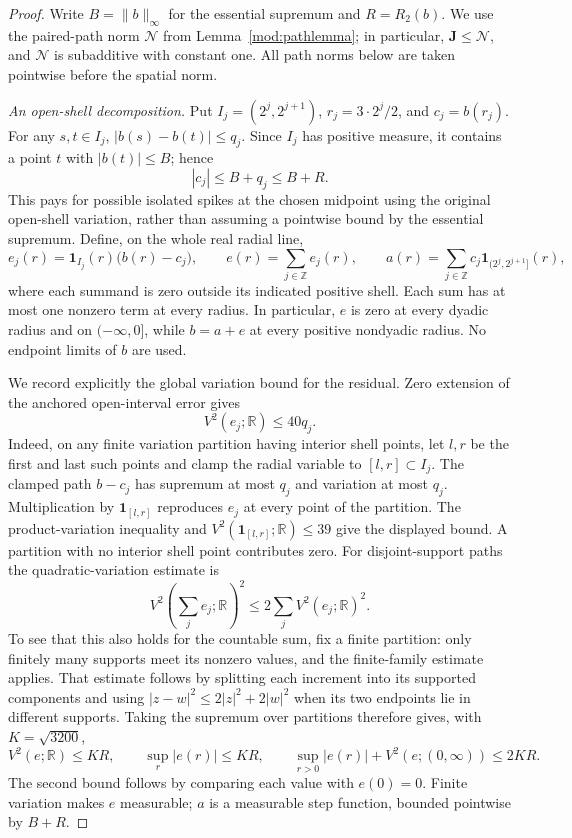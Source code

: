 \documentclass[11pt]{article}
\numberwithin{equation}{section}
\theoremstyle{remark}
\theoremstyle{definition}
\newcommand{\R}{\mathbb R}
\newcommand{\NN}{\mathcal N}
\begin{document}
\begin{proof}
Write $B=\|b\|_\infty$ for the essential supremum and $R=R_2(b)$.
We use the paired-path norm $\NN$ from Lemma~\ref{mod:pathlemma}; in
particular, $\mathbf J\le\NN$, and $\NN$ is subadditive with constant
one. All path norms below are taken pointwise before the spatial norm.

\emph{An open-shell decomposition.}
Put $I_j=(2^j,2^{j+1})$, $r_j=3\cdot2^j/2$, and $c_j=b(r_j)$.
For any $s,t\in I_j$, $|b(s)-b(t)|\le q_j$. Since $I_j$ has positive
measure, it contains a point $t$ with $|b(t)|\le B$; hence
\begin{equation}\label{eq:hilbert-shell-decomposition}
 |c_j|\le B+q_j\le B+R.
\end{equation}
This pays for possible isolated spikes at the chosen midpoint using the
original open-shell variation, rather than assuming a pointwise bound
by the essential supremum. Define, on the whole real radial line,
\[
 e_j(r)=\mathbf1_{I_j}(r)\bigl(b(r)-c_j\bigr),\qquad
 e(r)=\sum_{j\in\mathbb Z}e_j(r),\qquad
 a(r)=\sum_{j\in\mathbb Z}c_j\mathbf1_{(2^j,2^{j+1}]}(r),
\]
where each summand is zero outside its indicated positive shell.
Each sum has at most one nonzero term at every radius. In particular,
$e$ is zero at every dyadic radius and on $(-\infty,0]$, while
$b=a+e$ at every positive nondyadic radius. No endpoint limits of $b$
are used.

We record explicitly the global variation bound for the residual.
Zero extension of the anchored open-interval error gives
\[
 V^2(e_j;\R)\le40q_j.
\]
Indeed, on any finite variation partition having interior shell points,
let $l,r$ be the first and last such points and clamp the radial variable
to $[l,r]\subset I_j$. The clamped path $b-c_j$ has supremum at most
$q_j$ and variation at most $q_j$. Multiplication by
$\mathbf1_{[l,r]}$ reproduces $e_j$ at every point of the partition.
The product-variation inequality and
$V^2(\mathbf1_{[l,r]};\R)\le39$ give the displayed bound. A partition
with no interior shell point contributes zero.
For disjoint-support paths the quadratic-variation estimate is
\[
 V^2\!\left(\sum_j e_j;\R\right)^2
 \le2\sum_j V^2(e_j;\R)^2.
\]
To see that this also holds for the countable sum, fix a finite
partition: only finitely many supports meet its nonzero values, and
the finite-family estimate applies. That estimate follows by splitting
each increment into its supported components and using
$|z-w|^2\le2|z|^2+2|w|^2$ when its two endpoints lie in different
supports. Taking the supremum over partitions therefore gives, with
$K=\sqrt{3200}$,
\begin{equation}\label{eq:hilbert-residual-budget}
 V^2(e;\R)\le KR,\qquad
 \sup_r|e(r)|\le KR,\qquad
 \sup_{r>0}|e(r)|+V^2(e;(0,\infty))\le2KR.
\end{equation}
The second bound follows by comparing each value with $e(0)=0$.
Finite variation makes $e$ measurable; $a$ is a measurable step
function, bounded pointwise by $B+R$.


\end{proof}
\end{document}
